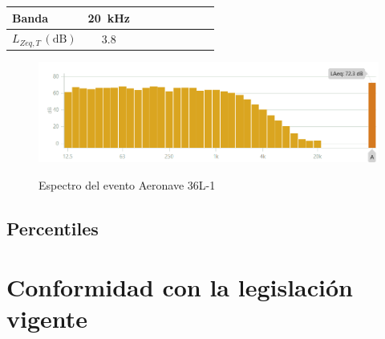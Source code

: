 \documentclass[11pt]{article}
\begin{document}
\begin{table}[htbp]
\begin{tabular}{|l||c|c|c|c|c|c|c|c|}
        Banda                       & \qty{20}{\kilo\hertz}   &                      &                      &                        &                         &                        &                         &                        \\ \hline
        $L_{Zeq,T} \, (\unit{\dB})$ & 3.8                     &                      &                      &                        &                         &                        &                         &                        \\ \hline
    \end{tabular}
    \label{tab:espectro_36L-1}
\end{table}


\begin{figure}[htp]
    \centering
    \caption{Espectro del evento Aeronave 36L-1}
    \includegraphics[width=\linewidth]{Imágenes/espectro.png}
    \label{fig:Espectro_36L-1.png}
\end{figure}

\subsection{Percentiles}

\section{Conformidad con la legislación vigente}


\nocite{*}
\newpage


\end{document}

